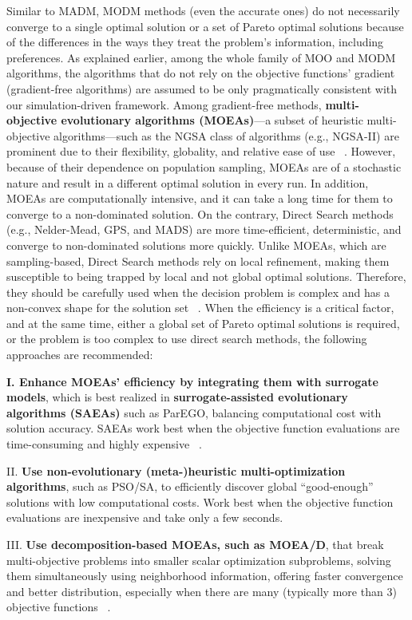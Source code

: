 \documentclass{sfuthesis}
\begin{document}
Similar to MADM, MODM methods (even the accurate ones) do not necessarily converge to a single optimal solution or a set of Pareto optimal solutions because of the differences in the ways they treat the problem’s information, including preferences. As explained earlier, among the whole family of MOO and MODM algorithms, the algorithms that do not rely on the objective functions’ gradient (gradient-free algorithms) are assumed to be only pragmatically consistent with our simulation-driven framework. Among gradient-free methods, \textbf{multi-objective evolutionary algorithms (MOEAs)}—a subset of heuristic multi-objective algorithms—such as the NGSA class of algorithms (e.g., NGSA-II) are prominent due to their flexibility, globality, and relative ease of use ~\cite{deb2011multi}. However, because of their dependence on population sampling, MOEAs are of a stochastic nature and result in a different optimal solution in every run. In addition, MOEAs are computationally intensive, and it can take a long time for them to converge to a non-dominated solution. On the contrary, Direct Search methods (e.g., Nelder-Mead, GPS, and MADS) are more time-efficient, deterministic, and converge to non-dominated solutions more quickly. Unlike MOEAs, which are sampling-based, Direct Search methods rely on local refinement, making them susceptible to being trapped by local and not global optimal solutions. Therefore, they should be carefully used when the decision problem is complex and has a non-convex shape for the solution set ~\cite{cano2022out}. When the efficiency is a critical factor, and at the same time, either a global set of Pareto optimal solutions is required, or the problem is too complex to use direct search methods, the following approaches are recommended:\par
\textbf{I. Enhance MOEAs’ efficiency by integrating them with surrogate models}, which is best realized in \textbf{surrogate-assisted evolutionary algorithms (SAEAs)} such as ParEGO, balancing computational cost with solution accuracy. SAEAs work best when the objective function evaluations are time-consuming and highly expensive ~\cite{kudela_comparing_2024}.\par
II. \textbf{Use non-evolutionary (meta-)heuristic multi-optimization algorithms}, such as PSO/SA, to efficiently discover global “good-enough” solutions with low computational costs. Work best when the objective function evaluations are inexpensive and take only a few seconds. \par
III. \textbf{Use decomposition-based MOEAs, such as MOEA/D}, that break multi-objective problems into smaller scalar optimization subproblems, solving them simultaneously using neighborhood information, offering faster convergence and better distribution, especially when there are many (typically more than 3) objective functions ~\cite{zhou_decomposition-based_2021}.\par
\end{document}
